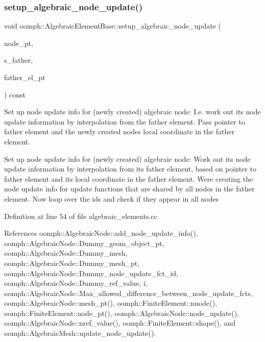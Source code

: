 \subsubsection{\texorpdfstring{setup\+\_\+algebraic\+\_\+node\+\_\+update()}{setup\_algebraic\_node\_update()}}
{\footnotesize\ttfamily void oomph\+::\+Algebraic\+Element\+Base\+::setup\+\_\+algebraic\+\_\+node\+\_\+update (\begin{DoxyParamCaption}\item[{\hyperlink{classoomph_1_1Node}{Node} $\ast$\&}]{node\+\_\+pt,  }\item[{const \hyperlink{classoomph_1_1Vector}{Vector}$<$ double $>$ \&}]{s\+\_\+father,  }\item[{\hyperlink{classoomph_1_1FiniteElement}{Finite\+Element} $\ast$}]{father\+\_\+el\+\_\+pt }\end{DoxyParamCaption}) const}



Set up node update info for (newly created) algebraic node\+: I.\+e. work out its node update information by interpolation from the father element. Pass pointer to father element and the newly created node\textquotesingle{}s local coordinate in the father element. 

Set up node update info for (newly created) algebraic node\+: Work out its node update information by interpolation from its father element, based on pointer to father element and its local coordinate in the father element. We\textquotesingle{}re creating the node update info for update functions that are shared by all nodes in the father element. Now loop over the ids and check if they appear in all nodes 

Definition at line 54 of file algebraic\+\_\+elements.\+cc.



References oomph\+::\+Algebraic\+Node\+::add\+\_\+node\+\_\+update\+\_\+info(), oomph\+::\+Algebraic\+Node\+::\+Dummy\+\_\+geom\+\_\+object\+\_\+pt, oomph\+::\+Algebraic\+Node\+::\+Dummy\+\_\+mesh, oomph\+::\+Algebraic\+Node\+::\+Dummy\+\_\+mesh\+\_\+pt, oomph\+::\+Algebraic\+Node\+::\+Dummy\+\_\+node\+\_\+update\+\_\+fct\+\_\+id, oomph\+::\+Algebraic\+Node\+::\+Dummy\+\_\+ref\+\_\+value, i, oomph\+::\+Algebraic\+Node\+::\+Max\+\_\+allowed\+\_\+difference\+\_\+between\+\_\+node\+\_\+update\+\_\+fcts, oomph\+::\+Algebraic\+Node\+::mesh\+\_\+pt(), oomph\+::\+Finite\+Element\+::nnode(), oomph\+::\+Finite\+Element\+::node\+\_\+pt(), oomph\+::\+Algebraic\+Node\+::node\+\_\+update(), oomph\+::\+Algebraic\+Node\+::nref\+\_\+value(), oomph\+::\+Finite\+Element\+::shape(), and oomph\+::\+Algebraic\+Mesh\+::update\+\_\+node\+\_\+update().



